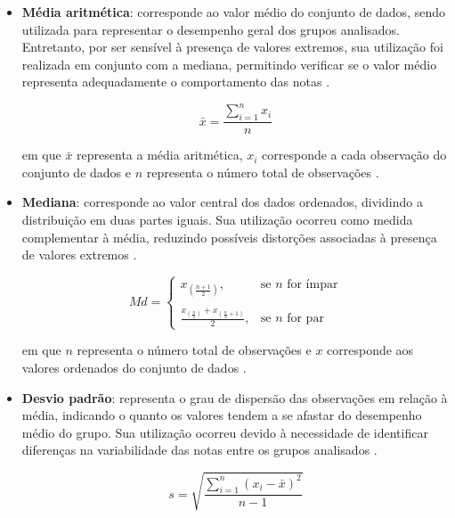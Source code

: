 \documentclass[a4paper,10pt, twocolumn]{article}
\begin{document}
\begin{itemize}

\item \textbf{Média aritmética}: corresponde ao valor médio do conjunto de dados, sendo utilizada para representar o desempenho geral dos grupos analisados. Entretanto, por ser sensível à presença de valores extremos, sua utilização foi realizada em conjunto com a mediana, permitindo verificar se o valor médio representa adequadamente o comportamento das notas \cite{labone_estatistica}.

\begin{equation}
\bar{x}=
\frac{\sum_{i=1}^{n}x_i}{n}
\end{equation}

em que $\bar{x}$ representa a média aritmética, $x_i$ corresponde a cada observação do conjunto de dados e $n$ representa o número total de observações \cite{labone_estatistica}.

\item \textbf{Mediana}: corresponde ao valor central dos dados ordenados, dividindo a distribuição em duas partes iguais. Sua utilização ocorreu como medida complementar à média, reduzindo possíveis distorções associadas à presença de valores extremos \cite{labone_estatistica}.

\begin{equation}
Md=
\begin{cases}
x_{\left(\frac{n+1}{2}\right)},
& \text{se } n \text{ for ímpar}
\\
\\
\frac{x_{\left(\frac{n}{2}\right)}
+x_{\left(\frac{n}{2}+1\right)}}{2},
& \text{se } n \text{ for par}
\end{cases}
\end{equation}

em que $n$ representa o número total de observações e $x$ corresponde aos valores ordenados do conjunto de dados \cite{labone_estatistica}.

\item \textbf{Desvio padrão}: representa o grau de dispersão das observações em relação à média, indicando o quanto os valores tendem a se afastar do desempenho médio do grupo. Sua utilização ocorreu devido à necessidade de identificar diferenças na variabilidade das notas entre os grupos analisados \cite{labone_estatistica}.

\begin{equation}
s=
\sqrt{
\frac{
\sum_{i=1}^{n}
(x_i-\bar{x})^2
}
{n-1}
}
\end{equation}


\end{itemize}
\end{document}

